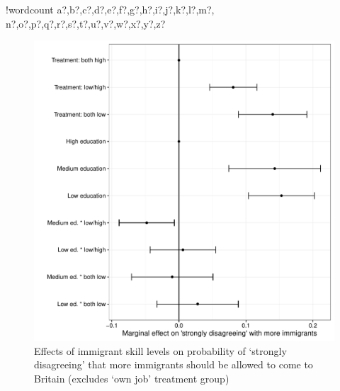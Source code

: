 \documentclass{article}\usepackage[]{graphicx}\usepackage[]{color}
\makeatletter
\def\maxwidth{ %
  \ifdim\Gin@nat@width>\linewidth
    \linewidth
  \else
    \Gin@nat@width
  \fi
}
\newcounter{words}
\newenvironment{counted}{%
\setcounter{words}{0}
\SearchList!{wordcount}{\stepcounter{words}}
{a?,b?,c?,d?,e?,f?,g?,h?,i?,j?,k?,l?,m?,
n?,o?,p?,q?,r?,s?,t?,u?,v?,w?,x?,y?,z?}
\UndoBoundary{'}
\SearchOrder{p;}}{%
\StopSearching}
\makeatother
\begin{document}
\begin{counted}
\begin{figure}
\includegraphics[width=\maxwidth]{figure/mainReplication-1} \caption[Effects of immigrant skill levels on probability of `strongly disagreeing' that more immigrants should be allowed to come to Britain (excludes `own job' treatment group)]{Effects of immigrant skill levels on probability of `strongly disagreeing' that more immigrants should be allowed to come to Britain (excludes `own job' treatment group)}\label{fig:mainReplication}
\end{figure}





\end{counted}
\end{document}
